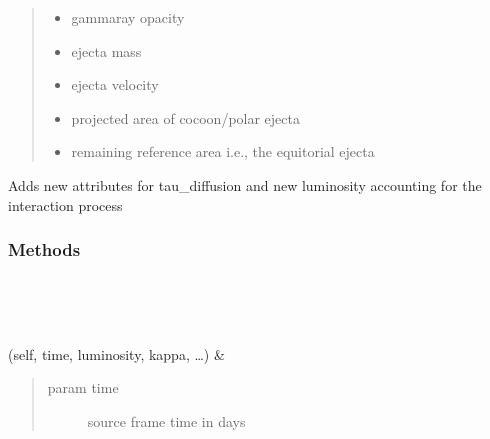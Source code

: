 \documentclass[letterpaper,10pt,english]{sphinxmanual}
\begin{document}
\begin{fulllineitems}
\begin{fulllineitems}
\begin{quote}
\begin{description}
\begin{itemize}
\item {} 
 \textendash{} gamma\sphinxhyphen{}ray opacity

\item {} 
 \textendash{} ejecta mass

\item {} 
 \textendash{} ejecta velocity

\item {} 
 \textendash{} projected area of cocoon/polar ejecta

\item {} 
 \textendash{} remaining reference area i.e., the equitorial ejecta

\end{itemize}

\end{description}\end{quote}

Adds new attributes for tau\_diffusion and new luminosity accounting for the interaction process

\end{fulllineitems}

\subsubsection*{Methods}


\begin{savenotes}\sphinxatlongtablestart\begin{longtable}[c]{}
\hline

\endfirsthead

%
{}\\
\hline

\endhead

\hline
{}\\
\endfoot

\endlastfoot

{\hyperref[\detokenize{generated/sdapy.interaction_processes.AsphericalDiffusion:sdapy.interaction_processes.AsphericalDiffusion.__init__}]{}}(self, time, luminosity, kappa, …)
&
\begin{quote}\begin{description}
\item[{param time}] \leavevmode
source frame time in days


\end{description}
\end{quote}
\end{longtable}
\end{savenotes}
\end{fulllineitems}
\end{document}
